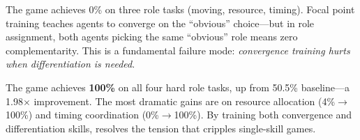 \begin{table}[t]
\centering
\caption{Complementarity scores (\%) on role assignment tasks ($N{=}50$ pairs). Standard tasks require binary role division; hard tasks require 3-way assignment or resource/timing coordination. Best result per task in \textbf{bold}.}
\label{tab:roles}
\small
{}
\end{table}

The \focalpt game achieves 0\% on three role tasks (moving, resource, timing).
Focal point training teaches agents to converge on the ``obvious'' choice---but in role assignment, both agents picking the same ``obvious'' role means zero complementarity.
This is a fundamental failure mode: \emph{convergence training hurts when differentiation is needed}.

The \aidesigned game achieves \textbf{100\%} on all four hard role tasks, up from 50.5\% baseline---a 1.98$\times$ improvement.
The most dramatic gains are on resource allocation (4\%$\to$100\%) and timing coordination (0\%$\to$100\%).
By training both convergence and differentiation skills, \syncminds resolves the tension that cripples single-skill games.

